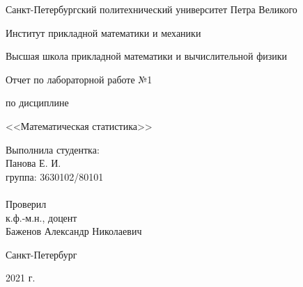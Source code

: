 \begin{titlepage}

\thispagestyle{empty}

\centerline{Санкт-Петербургский политехнический университет Петра Великого}
\centerline{Институт прикладной математики и механики}
\centerline{Высшая школа прикладной математики и вычислительной физики}

\vfill

\centerline{\large{Отчет по лабораторной работе №1}}
\centerline{\large{по дисциплине}}
\centerline{\LARGE{<<Математическая статистика>>}}
\vfill

\newbox{\lbox}
\newlength{\maxl}
\setlength{\maxl}{\wd\lbox}
\hfill\parbox{11cm}{
\hspace*{5cm}\hspace*{0cm}Выполнила студентка:\\
\hspace*{5cm}\hspace*{0cm}Панова Е. И.\\
\hspace*{5cm}\hspace*{0cm}группа: 3630102/80101\\
\\
\hspace*{5cm}\hspace*{0cm}Проверил\\
\hspace*{5cm}\hspace*{0cm}к.ф.-м.н., доцент\\
\hspace*{5cm}\hspace*{0cm}Баженов Александр Николаевич\\
}
\vfill

\centerline{Санкт-Петербург}
\centerline{2021 г.}
\clearpage
\end{titlepage}